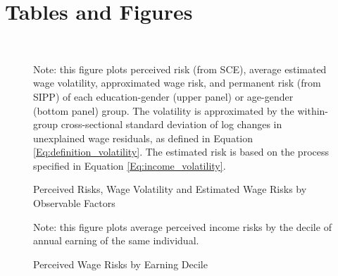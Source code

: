                         \newpage 
   
  \section*{Tables and Figures} 
    
    
    
    \begin{figure}[!ht]
    	\caption{Perceived Risks, Wage Volatility and Estimated Wage Risks by Observable Factors}
    	\label{fig:group_compare}
    	\begin{center}
    		 \\
    		\medskip
    	\end{center}
    	
    	\begin{flushleft}Note: this figure plots perceived risk (from SCE), average estimated wage volatility, approximated wage risk, and permanent risk (from SIPP) of each education-gender (upper panel) or age-gender (bottom panel) group. The volatility is approximated by the within-group cross-sectional standard deviation of log changes in unexplained wage residuals, as defined in Equation \ref{Eq:definition_volatility}. The estimated risk is based on the process specified in Equation \ref{Eq:income_volatility}.\end{flushleft}
    \end{figure}

    \clearpage
    \begin{figure}[!ht]
    	\caption{Perceived Wage Risks by Earning Decile}
    	\label{fig:barplot_byinc}
    	\begin{center}\end{center}
    \begin{flushleft}Note: this figure plots average perceived income risks by the decile of annual earning of the same individual.\end{flushleft}
    \end{figure}
    
    
    \clearpage
    
